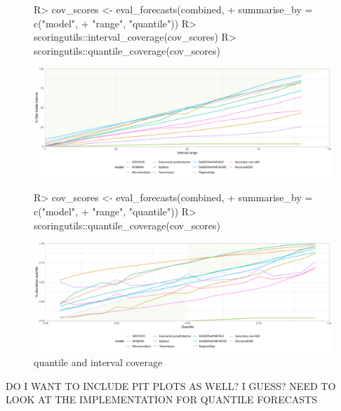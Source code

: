 \documentclass[article,shortnames]{jss}
\begin{document}
\begin{figure}[h!]
\centering
\begin{Schunk}
\begin{Sinput}
R> cov_scores <- eval_forecasts(combined, 
+                               summarise_by = c("model", 
+                                                "range", "quantile"))
R> scoringutils::interval_coverage(cov_scores)
R> scoringutils::quantile_coverage(cov_scores)
\end{Sinput}
\end{Schunk}
\includegraphics{plots/plot-coverage}

\begin{Schunk}
\begin{Sinput}
R> cov_scores <- eval_forecasts(combined, 
+                               summarise_by = c("model", 
+                                                "range", "quantile"))
R> scoringutils::quantile_coverage(cov_scores)
\end{Sinput}
\end{Schunk}
\includegraphics{plots/plot-quantile-coverage}

\caption{\label{fig:coverage} quantile and interval coverage}
\end{figure}


DO I WANT TO INCLUDE PIT PLOTS AS WELL? I GUESS? NEED TO LOOK AT THE IMPLEMENTATION FOR QUANTILE FORECASTS

% 
\end{document}
